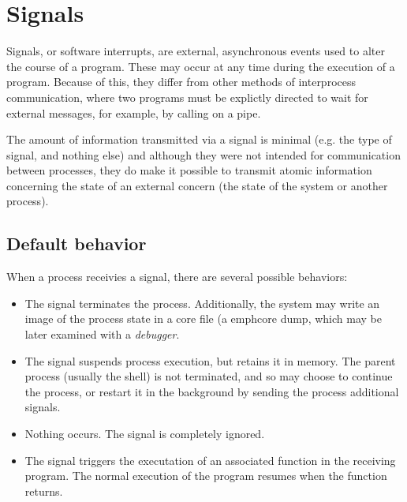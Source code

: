%
%

\chapter{Signals}
\label{sec/signals}

Signals, or software interrupts, are external, asynchronous events
used to alter the course of a program.  These may occur at any
time during the execution of a program.  Because of this,
they differ from other methods of interprocess communication, where
two programs must be explictly directed to wait for external messages,
for example, by calling  on a pipe.

The amount of information transmitted via a signal is minimal (e.g.
the type of signal, and nothing else) and although they were not
intended for communication between processes, they do make it
possible to transmit atomic information concerning the state of an
external concern (the state of the system or another process). 

\section{Default behavior}

When a process receivies a signal, there are several possible behaviors:
%
\begin{itemize}
\item 
The signal terminates the process.  Additionally, the system may write
an image of the process state in a core file (a emph{core dump}, which
may be later examined with a \emph{debugger}.
%
\item 
The signal suspends process execution, but retains it in memory.  The
parent process (usually the shell) is not terminated, and so may
choose to continue the process, or restart it in the background by
sending the process additional signals.
%
\item Nothing occurs.  The signal is completely ignored.
%
\item The signal triggers the executation of an associated function in the
receiving program.  The normal execution of the program resumes when the
function returns.
\end{itemize}
%

